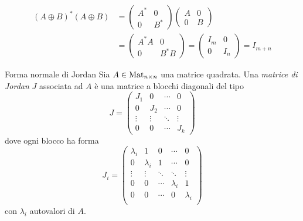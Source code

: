 \documentclass[a4paper]{article}
\begin{document}
\begin{snippetproof}{}
    \begin{align*}
        (A \oplus B)^* (A \oplus B) &=
        \begin{pmatrix}
            A^* & 0 \\ 0 & B^*
        \end{pmatrix}
        \begin{pmatrix}
            A & 0 \\ 0 & B
        \end{pmatrix} \\
        &=
        \begin{pmatrix}
            A^* A & 0 \\ 0 & B^* B
        \end{pmatrix} =
        \begin{pmatrix}
            I_m & 0 \\ 0 & I_n
        \end{pmatrix} = I_{m+n}
    \end{align*}
\end{snippetproof}

\begin{snippetdefinition}{Forma normale di Jordan}
    Sia \(A \in \operatorname{Mat}_{n\times n}\) una matrice quadrata.
    Una \emph{matrice di Jordan} \(J\) associata ad \(A\) è una matrice a blocchi diagonali del tipo
    \[
        J =
        \begin{pmatrix}
            J_1 & 0 & \cdots & 0 \\
            0 & J_2 & \cdots & 0 \\
            \vdots & \vdots & \ddots & \vdots \\
            0 & 0 & \cdots & J_k
        \end{pmatrix}
    \]
    dove ogni blocco ha forma
    \[
        J_i =
        \begin{pmatrix}
            \lambda_i & 1 & 0 & \cdots & 0 \\
            0 & \lambda_i & 1 & \cdots & 0 \\
            \vdots & \vdots & \ddots & \ddots & \vdots \\
            0 & 0 & \cdots & \lambda_i & 1 \\
            0 & 0 & \cdots & 0 & \lambda_i \\
        \end{pmatrix}
    \]
    con \(\lambda_i\) autovalori di \(A\).
\end{snippetdefinition}
\end{document}

